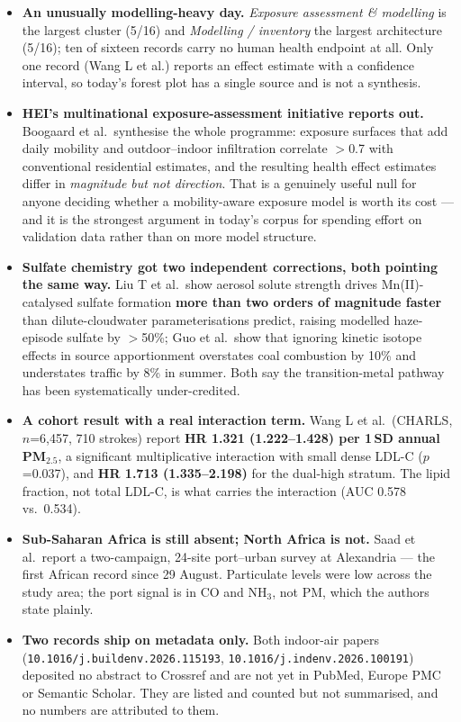 \documentclass[10pt]{article}
\begin{document}
\footnotesize
\begin{itemize}
\item \textbf{An unusually modelling-heavy day.} \textit{Exposure assessment \&
modelling} is the largest cluster (5/16) and \textit{Modelling / inventory} the largest
architecture (5/16); ten of sixteen records carry no human health endpoint at all. Only
one record (Wang L et al.) reports an effect estimate with a confidence interval, so
today's forest plot has a single source and is not a synthesis.

\item \textbf{HEI's multinational exposure-assessment initiative reports out.} Boogaard
et al.\ synthesise the whole programme: exposure surfaces that add daily mobility and
outdoor--indoor infiltration correlate $>$0.7 with conventional residential estimates,
and the resulting health effect estimates differ in \emph{magnitude but not direction}.
That is a genuinely useful null for anyone deciding whether a mobility-aware exposure
model is worth its cost --- and it is the strongest argument in today's corpus for
spending effort on validation data rather than on more model structure.

\item \textbf{Sulfate chemistry got two independent corrections, both pointing the same
way.} Liu T et al.\ show aerosol solute strength drives Mn(II)-catalysed sulfate
formation \textbf{more than two orders of magnitude faster} than dilute-cloudwater
parameterisations predict, raising modelled haze-episode sulfate by $>$50\%; Guo et al.\
show that ignoring kinetic isotope effects in source apportionment overstates coal
combustion by 10\% and understates traffic by 8\% in summer. Both say the transition-metal
pathway has been systematically under-credited.

\item \textbf{A cohort result with a real interaction term.} Wang L et al.\ (CHARLS,
$n$=6{,}457, 710 strokes) report \textbf{HR 1.321 (1.222--1.428) per 1\,SD annual
PM$_{2.5}$}, a significant multiplicative interaction with small dense LDL-C
($p$=0.037), and \textbf{HR 1.713 (1.335--2.198)} for the dual-high stratum. The lipid
fraction, not total LDL-C, is what carries the interaction (AUC 0.578 vs.\ 0.534).

\item \textbf{Sub-Saharan Africa is still absent; North Africa is not.} Saad et al.\
report a two-campaign, 24-site port--urban survey at Alexandria --- the first African
record since 29 August. Particulate levels were low across the study area; the port
signal is in CO and NH$_3$, not PM, which the authors state plainly.

\item \textbf{Two records ship on metadata only.} Both indoor-air papers
(\texttt{10.1016/j.buildenv.2026.115193}, \texttt{10.1016/j.indenv.2026.100191})
deposited no abstract to Crossref and are not yet in PubMed, Europe PMC or Semantic
Scholar. They are listed and counted but not summarised, and no numbers are attributed
to them.
\end{itemize}
\end{document}
